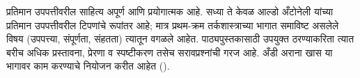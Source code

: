 \documentclass[../../include/open-logic-part]{subfiles}
\begin{document}

\begin{editorial}
  प्रतिमान उपपत्तीवरील साहित्य अपूर्ण आणि प्रयोगात्मक आहे. सध्या ते केवळ
  आल्डो अँटोनेली यांच्या प्रतिमान उपपत्तीवरील टिपणांचे रूपांतर आहे; मात्र
  प्रथम-क्रम तर्कशास्त्राच्या भागात समाविष्ट असलेले विषय (उपपत्त्या, संपूर्णता,
  संहतता) त्यातून वगळले आहेत. पाठ्यपुस्तकासाठी उपयुक्त ठरण्याकरिता त्यात बरीच
  अधिक प्रस्तावना, प्रेरणा व स्पष्टीकरण तसेच सरावप्रश्नांची गरज आहे. अँडी अराना
  खास या भागावर काम करण्याचे नियोजन करीत आहेत ().
\end{editorial}





\OLEndPartHook
\end{document}

